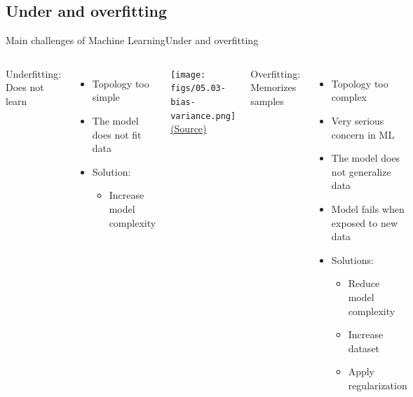 \documentclass[10pt,compress]{beamer} %
\begin{document}
\subsection{Under and overfitting}
\begin{frame}{Main challenges of Machine Learning}{Under and overfitting}
    \begin{columns}
		\alert{Underfitting}: Does not learn
            \begin{itemize}
                \item Topology too simple
				\item The model does not fit data
				\item Solution: 
				\begin{itemize}
					\item Increase model complexity
				\end{itemize}
            \end{itemize}

            \begin{center}
			\texttt{[image: figs/05.03-bias-variance.png]}\\
			\scriptsize \href{https://jakevdp.github.io/PythonDataScienceHandbook/05.03-hyperparameters-and-model-validation.html}{(Source)}
            \end{center}

		\alert{Overfitting}: Memorizes samples
            \begin{itemize}
                \item Topology too complex
                \item Very serious concern in ML
				\item The model does not generalize data
                \item Model fails when exposed to new data
				\item Solutions:
				\begin{itemize}
					\item Reduce model complexity
					\item Increase dataset
					\item Apply regularization
				\end{itemize}
            \end{itemize}
   \end{columns}
\end{frame}
\end{document}
